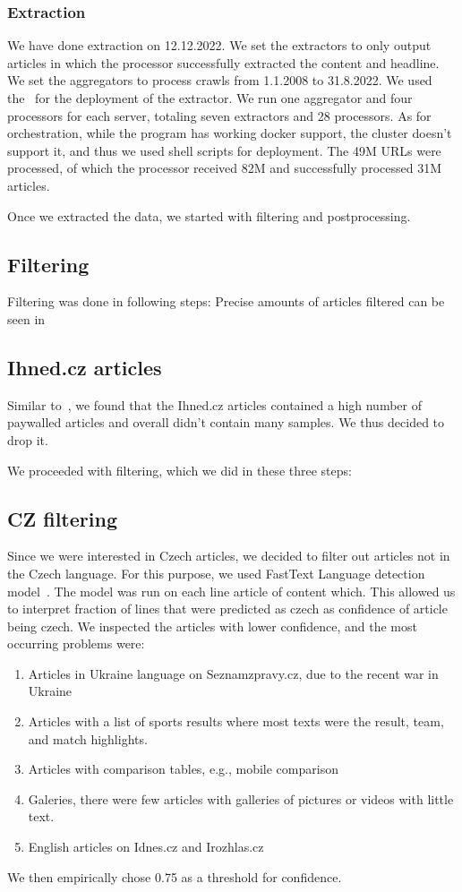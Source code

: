 \subsubsection{Extraction}
We have done extraction on 12.12.2022.
We set the extractors to only output articles in which the processor successfully
extracted the content and headline.
We set the aggregators to process crawls from 1.1.2008 to 31.8.2022.
We used the~\cite{UFALAIC} for the deployment of the extractor. 
We run one aggregator and four processors for each server,
totaling seven extractors and 28 processors.
As for orchestration, while the program has working docker support,
the cluster doesn't support it, and thus we used shell scripts for deployment.
The 49M URLs were processed, of which the processor received 82M
and successfully processed 31M articles.

Once we extracted the data, we started with filtering and postprocessing.
\subsection{Filtering}

Filtering was done in following steps:
Precise amounts of articles filtered can be seen in



\subsection{Ihned.cz articles}
Similar to~\cite{strakaSumeCzechLargeCzech2018a}, we found that the Ihned.cz articles contained
a high number of paywalled articles and overall didn't contain many samples.
We thus decided to drop it.

We proceeded with filtering, which we did in these three steps:
\subsection{CZ filtering}
Since we were interested in Czech articles, we decided to filter out articles
not in the Czech language. For this purpose,
we used FastText Language detection model~\cite{joulinFastTextZipCompressing2016,joulinBagTricksEfficient2016}. The model was run on each line article of content which. This allowed us to interpret fraction of lines that were predicted as czech as confidence of article being czech.
We inspected the articles with lower confidence, and the most occurring problems were:
\begin{enumerate}
    \item Articles in Ukraine language on Seznamzpravy.cz, due to the recent war in Ukraine
    \item Articles with a list of sports results where most texts were
    the result, team, and match highlights.
    \item Articles with comparison tables, e.g., mobile comparison
    \item Galeries, there were few articles with galleries of pictures or videos with little text.
    \item English articles on Idnes.cz and Irozhlas.cz
\end{enumerate}
We then empirically chose 0.75 as a threshold for confidence.


